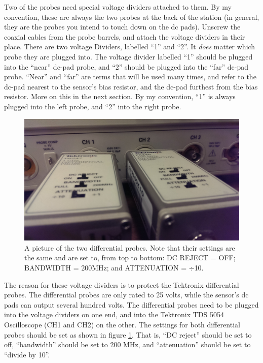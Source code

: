 \documentclass{report}
\begin{document}
            Two of the probes need special voltage dividers attached to them. By my convention, these are always the two probes at the back of the station (in general, they are the probes you intend to touch down on the dc pads). Unscrew the coaxial cables from the probe barrels, and attach the voltage dividers in their place. There are two voltage Dividers, labelled ``1'' and ``2''. It \textit{does} matter which probe they are plugged into. The voltage divider labelled ``1'' should be plugged into the ``near'' dc-pad probe, and ``2'' should be plugged into the ``far'' dc-pad probe. ``Near'' and ``far'' are terms that will be used many times, and refer to the dc-pad nearest to the sensor's bias resistor, and the dc-pad furthest from the bias resistor. More on this in the next section. By my convention, ``1'' is always plugged into the left probe, and ``2'' into the right probe.
            
            \begin{figure}[h] 
                \includegraphics[height=.4\textheight]{diff_probe}
                \centering
                \caption{ A picture of the two differential probes. Note that their settings are the same and are set to, from top to bottom: DC REJECT = OFF; BANDWIDTH = 200MHz; and ATTENUATION = $\div$10. }
                \label{fig:diff_probe}
            \end{figure}

            The reason for these voltage dividers is to protect the Tektronix differential probes. The differential probes are only rated to 25 volts, while the sensor's dc pads can output several hundred volts. The differential probes need to be plugged into the voltage dividers on one end, and into the Tektronix TDS 5054 Oscilloscope (CH1 and CH2) on the other. The settings for both differential probes should be set as shown in figure \ref{fig:diff_probe}. That is, ``DC reject'' should be set to off, ``bandwidth'' should be set to 200 MHz, and ``attenuation'' should be set to ``divide by 10''.
\end{document}

